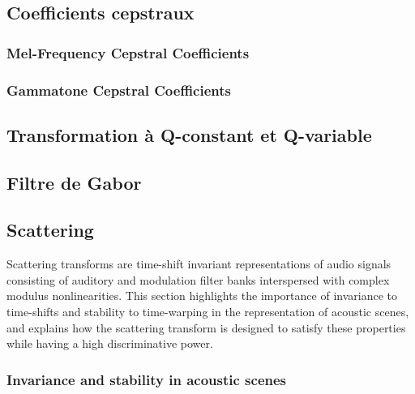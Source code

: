 \subsection{Coefficients cepstraux}

\subsubsection{Mel-Frequency Cepstral Coefficients}
\label{sec:ch6_mfcc}
 
\subsubsection{Gammatone Cepstral Coefficients}
\label{sec:ch6_Gammatone}
 
\subsection{Transformation à Q-constant et Q-variable}
 \label{sec:ch6_VQT_CQT}
 
\subsection{Filtre de Gabor}
\label{sec:ch6_gabor}

\subsection{Scattering}
\label{sec:ch6_scattering}

Scattering transforms are time-shift invariant representations of audio signals consisting of auditory and modulation filter banks interspersed with complex modulus nonlinearities.
This section highlights the importance of invariance to time-shifts and stability to time-warping in the representation of acoustic scenes, and explains how the scattering transform is designed to satisfy these properties while having a high discriminative power.

\subsubsection{Invariance and stability in acoustic scenes}

